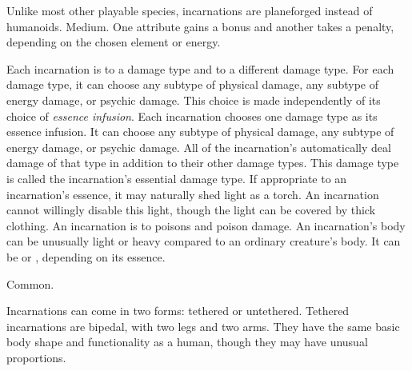      Unlike most other playable species, incarnations are planeforged instead of humanoids.
     Medium.
     One attribute gains a  bonus and another takes a  penalty, depending on the chosen element or energy.
    \begin{itemize}
         Each incarnation is \impervious to a damage type and \vulnerable to a different damage type.
        For each damage type, it can choose any subtype of physical damage, any subtype of energy damage, or psychic damage.
        This choice is made independently of its choice of \textit{essence infusion}.
         Each incarnation chooses one damage type as its essence infusion.
        It can choose any subtype of physical damage, any subtype of energy damage, or psychic damage.
        All of the incarnation's  automatically deal damage of that type in addition to their other damage types.
        This damage type is called the incarnation's essential damage type.
         If appropriate to an incarnation's essence, it may naturally shed light as a torch.
        An incarnation cannot willingly disable this light, though the light can be covered by thick clothing.
         An incarnation is \impervious to poisons and poison damage.
         An incarnation's body can be unusually light or heavy compared to an ordinary creature's body.
        It can be  or , depending on its essence.
    \end{itemize}
     Common.

    Incarnations can come in two forms: tethered or untethered.
    Tethered incarnations are bipedal, with two legs and two arms.
    They have the same basic body shape and functionality as a human, though they may have unusual proportions.

